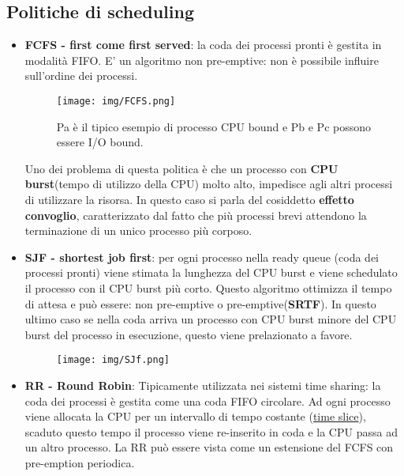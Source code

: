 \documentclass{article}
\begin{document}
\subsection{Politiche di scheduling}
\begin{itemize}
    \item \textbf{FCFS - first come first served}: la coda
    dei processi pronti è gestita in modalità FIFO. 
    E' un algoritmo non pre-emptive: non è possibile influire 
    sull'ordine dei processi.


    \begin{figure}[h!]
        \begin{center}
            \texttt{[image: img/FCFS.png]}  
            
            Pa è il tipico esempio di processo CPU bound e 
            Pb e Pc possono essere I/O bound.
        \end{center}
    \end{figure}


    Uno dei problema di questa politica è che un processo
    con \textbf{CPU burst}(tempo di utilizzo della CPU) molto alto,
    impedisce agli altri processi di utilizzare la risorsa. 
    In questo caso si parla del cosiddetto \textbf{effetto convoglio},
    caratterizzato dal fatto che più processi brevi attendono
    la terminazione di un unico processo più corposo.
    
    \item \textbf{SJF - shortest job first}: per ogni processo
    nella ready queue (coda dei processi pronti) viene 
    stimata la lunghezza del CPU burst e viene schedulato il
    processo con il CPU burst più corto. Questo algoritmo 
    ottimizza il tempo di attesa e può essere: non pre-emptive 
    o pre-emptive(\textbf{SRTF}). In questo ultimo caso se nella coda
    arriva un processo con CPU burst minore del CPU burst del processo in esecuzione, questo viene prelazionato
    a favore.

    \begin{figure}[h!]
        \begin{center}
            \texttt{[image: img/SJf.png]}  
        \end{center}
    \end{figure}

    \item   \textbf{RR - Round Robin}: Tipicamente utilizzata 
    nei sistemi time sharing: la coda dei processi è gestita
    come una coda FIFO circolare. Ad ogni processo viene 
    allocata la CPU per un intervallo di tempo costante (\underline{time slice}),
    scaduto questo tempo il processo viene re-inserito in coda
    e la CPU passa ad un altro processo. La RR può essere vista
    come un estensione del FCFS con pre-emption periodica.


\end{itemize}
\end{document}
